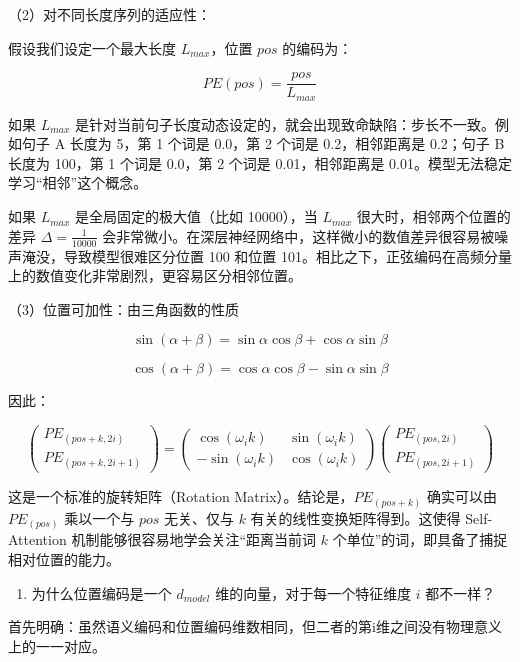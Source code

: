 （2）对不同长度序列的适应性：

假设我们设定一个最大长度 \(L_{max}\)，位置 \(pos\) 的编码为：

\[
PE(pos)=\frac{pos}{L_{max}}
\]

如果 \(L_{max}\) 是针对当前句子长度动态设定的，就会出现致命缺陷：步长不一致。例如句子 A 长度为 5，第 1 个词是 0.0，第 2 个词是 0.2，相邻距离是 0.2；句子 B 长度为 100，第 1 个词是 0.0，第 2 个词是 0.01，相邻距离是 0.01。模型无法稳定学习``相邻''这个概念。

如果 \(L_{max}\) 是全局固定的极大值（比如 10000），当 \(L_{max}\) 很大时，相邻两个位置的差异 \(\Delta=\frac{1}{10000}\) 会非常微小。在深层神经网络中，这样微小的数值差异很容易被噪声淹没，导致模型很难区分位置 100 和位置 101。相比之下，正弦编码在高频分量上的数值变化非常剧烈，更容易区分相邻位置。

（3）位置可加性：由三角函数的性质

\[
\sin(\alpha+\beta)=\sin\alpha\cos\beta+\cos\alpha\sin\beta
\]

\[
\cos(\alpha+\beta)=\cos\alpha\cos\beta-\sin\alpha\sin\beta
\]

因此：

\[
\begin{pmatrix}
PE_{(pos+k,2i)} \\
PE_{(pos+k,2i+1)}
\end{pmatrix}
=
\begin{pmatrix}
\cos(\omega_i k) & \sin(\omega_i k) \\
-\sin(\omega_i k) & \cos(\omega_i k)
\end{pmatrix}
\begin{pmatrix}
PE_{(pos,2i)} \\
PE_{(pos,2i+1)}
\end{pmatrix}
\]

这是一个标准的旋转矩阵（Rotation Matrix）。结论是，\(PE_{(pos+k)}\) 确实可以由 \(PE_{(pos)}\) 乘以一个与 \(pos\) 无关、仅与 \(k\) 有关的线性变换矩阵得到。这使得 Self-Attention 机制能够很容易地学会关注``距离当前词 \(k\) 个单位''的词，即具备了捕捉相对位置的能力。

\begin{enumerate}
\def\labelenumi{\arabic{enumi}.}
\setcounter{enumi}{1}
\tightlist
\item
  为什么位置编码是一个 \(d_{model}\) 维的向量，对于每一个特征维度 \(i\) 都不一样？
\end{enumerate}

首先明确：虽然语义编码和位置编码维数相同，但二者的第i维之间没有物理意义上的一一对应。

